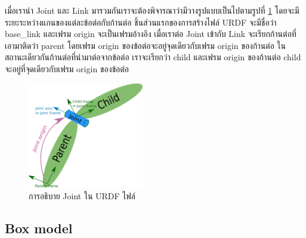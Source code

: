 
เมื่อเรานำ Joint และ Link มารวมกันเราจะต้องพิจารณาว่ามีวางรูปแบบเป็นไปตามรูปที่ \ref{fig:urdf_joint}
โดยจะมีระยะระหว่างแกนของแต่ละข้อต่อกับก้านต่อ ชิ้นส่วนแรกของการสร้างไฟล์ URDF จะมีชื่อว่า base\_link
และเฟรม origin จะเป็นเฟรมอ้างอิง เมื่อเราต่อ Joint เข้ากับ Link จะเรียกก้านต่อที่เอามาติดว่า parent
โดยเฟรม origin ของข้อต่อจะอยู่จุดเดียวกับเฟรม origin ของก้านต่อ ในสถานะเดียวกันก้านต่อที่นำมาต่อจากข้อต่อ
เราจะเรียกว่า child และเฟรม origin ของก้านต่อ child จะอยู่ที่จุดเดียวกับเฟรม origin ของข้อต่อ

\begin{figure}[h]
	\centering
	\includegraphics[width=0.45\textwidth]{chapter3/images/urdf_joint.png}
	\caption{การอธิบาย Joint ใน URDF ไฟล์}
	\label{fig:urdf_joint}
\end{figure}

\subsection{Box model}
